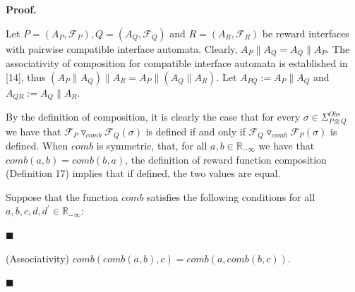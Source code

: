 \documentclass[10pt,a4paper]{article}
\begin{document}
 
 
 
 
\par\medskip\noindent\textbf{Proof.}\par
 
 
Let $P=(A_{P},\mathcal{F}_{P}),Q=(A_{Q},\mathcal{F}_{Q})$ and $R=(A_{R},\mathcal{F}_{R})$ be reward interfaces with pairwise compatible interface automata. Clearly, $A_{P}\parallel A_{Q}=A_{Q}\parallel A_{P}$. The associativity of composition for compatible interface automata is established in [14], thus $(A_{P}\parallel A_{Q})\parallel A_{R}=A_{P}\parallel(A_{Q}\parallel A_{R})$. Let $A_{PQ}:=A_{P}\parallel A_{Q}$ and $A_{QR}:=A_{Q}\parallel A_{R}$.\par
 
 
 
By the definition of composition, it is clearly the case that for every $\sigma\in\Sigma_{P\otimes Q}^{Obs}$ we have that ${{\mathcal{F}_{P}}\mathbin{\triangledown_{\mathit{comb}}}{\mathcal{F}_{Q}}}(\sigma)$ is defined if and only if ${{\mathcal{F}_{Q}}\mathbin{\triangledown_{\mathit{comb}}}{\mathcal{F}_{P}}}(\sigma)$ is defined. When $\mathit{comb}$ is symmetric, that, for all $a,b\in\mathbb{R}_{-\infty}$ we have that $\mathit{comb}(a,b)=\mathit{comb}(b,a)$, the definition of reward function composition (Definition 17) implies that if defined, the two values are equal.\par
 
 
 
Suppose that the function $\mathit{comb}$ satisfies the following conditions for all $a,b,c,d,d^{\prime}\in\mathbb{R}_{-\infty}$:\par
  
\par\noindent  $\blacksquare$ 
 
(Associativity) $\mathit{comb}(comb(a,b),c)=\mathit{comb}(a,comb(b,c))$.\par
 
 
 
\par\noindent  $\blacksquare$ 
 
\end{document}

